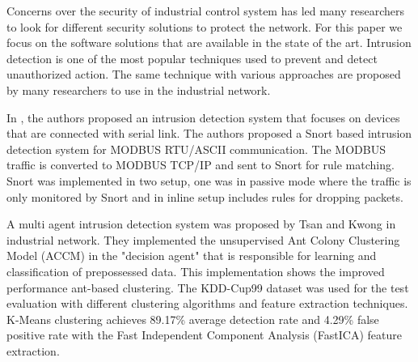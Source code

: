\documentclass[conference]{IEEEtran}
\begin{document}
Concerns over the security of industrial control system has led many researchers to look for different security solutions to protect the network. For this paper we focus on the software solutions that are available in the state of the art. Intrusion detection is one of the most popular techniques used to prevent and detect unauthorized action. The same technique with various approaches are proposed by many researchers to use in the industrial network. 
\par In \cite{c2}, the authors proposed an intrusion detection system that focuses on devices that are connected with serial link. The authors proposed a Snort based intrusion detection system for MODBUS RTU/ASCII communication. The MODBUS traffic is converted to MODBUS TCP/IP and sent to Snort for rule matching. Snort was implemented in two setup, one was in passive mode where the traffic is only monitored by Snort and in inline setup includes rules for dropping packets.
\par A multi agent intrusion detection system was proposed by Tsan and Kwong \cite{c3} in industrial network. They implemented the unsupervised Ant Colony Clustering Model (ACCM) in the "decision agent" that is responsible for learning and classification of prepossessed data. This implementation shows the improved performance ant-based clustering. The KDD-Cup99 dataset was used for the test evaluation with different clustering algorithms and feature extraction techniques. K-Means clustering achieves 89.17\% average detection rate and  4.29\% false positive rate with the Fast Independent Component Analysis (FastICA) feature extraction.
\end{document}
